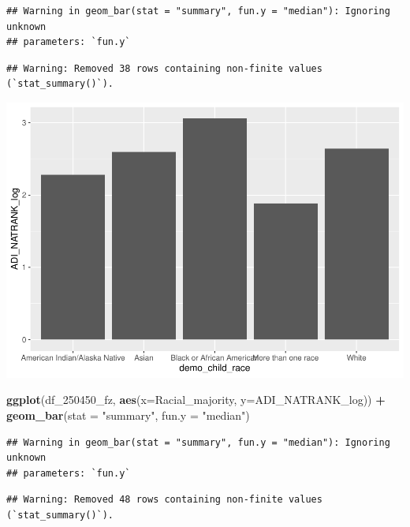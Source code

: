 \documentclass[
]{article}
\newenvironment{Shaded}{\begin{snugshade}}{\end{snugshade}}
\newcommand{\AttributeTok}[1]{\textcolor[rgb]{0.13,0.29,0.53}{#1}}
\newcommand{\FunctionTok}[1]{\textcolor[rgb]{0.13,0.29,0.53}{\textbf{#1}}}
\newcommand{\NormalTok}[1]{#1}
\newcommand{\SpecialCharTok}[1]{\textcolor[rgb]{0.81,0.36,0.00}{\textbf{#1}}}
\newcommand{\StringTok}[1]{\textcolor[rgb]{0.31,0.60,0.02}{#1}}
\begin{document}
\begin{verbatim}
## Warning in geom_bar(stat = "summary", fun.y = "median"): Ignoring unknown
## parameters: `fun.y`
\end{verbatim}

\begin{verbatim}
## Warning: Removed 38 rows containing non-finite values (`stat_summary()`).
\end{verbatim}

\includegraphics{do01_BUDS_files/figure-latex/unnamed-chunk-8-1.pdf}

\begin{Shaded}
\begin{Highlighting}[]
\FunctionTok{ggplot}\NormalTok{(df\_250450\_fz, }\FunctionTok{aes}\NormalTok{(}\AttributeTok{x=}\NormalTok{Racial\_majority, }\AttributeTok{y=}\NormalTok{ADI\_NATRANK\_log)) }\SpecialCharTok{+}
  \FunctionTok{geom\_bar}\NormalTok{(}\AttributeTok{stat =} \StringTok{"summary"}\NormalTok{, }\AttributeTok{fun.y =} \StringTok{"median"}\NormalTok{)}
\end{Highlighting}
\end{Shaded}

\begin{verbatim}
## Warning in geom_bar(stat = "summary", fun.y = "median"): Ignoring unknown
## parameters: `fun.y`
\end{verbatim}

\begin{verbatim}
## Warning: Removed 48 rows containing non-finite values (`stat_summary()`).
\end{verbatim}
\end{document}
